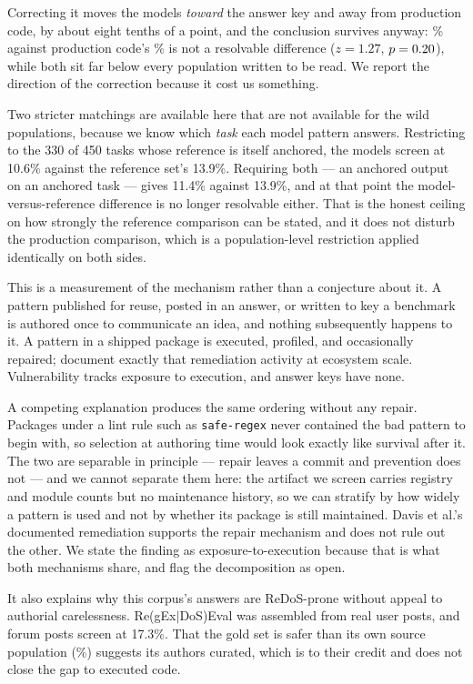 \documentclass[11pt]{article}
\begin{document}
Correcting it moves the models \emph{toward} the answer key and away from
production code, by about eight tenths of a point, and the conclusion survives
anyway: \anchoredmodels{}\% against production code's \anchoredprod{}\% is not
a resolvable difference ($z = 1.27$, $p = 0.20{}$), while both sit far
below every population written to be read. We report the direction of the
correction because it cost us something.

Two stricter matchings are available here that are not available for the wild
populations, because we know which \emph{task} each model pattern answers.
Restricting to the 330 of 450 tasks whose reference is itself anchored, the
models screen at 10.6\% against the reference set's 13.9\%. Requiring both ---
an anchored output on an anchored task --- gives 11.4\% against 13.9\%, and at
that point the model-versus-reference difference is no longer resolvable
either. That is the honest ceiling on how strongly the reference comparison
can be stated, and it does not disturb the production comparison, which is a
population-level restriction applied identically on both sides.

This is a measurement of the mechanism rather than a conjecture about it. A
pattern published for reuse, posted in an answer, or written to key a
benchmark is authored once to communicate an idea, and nothing subsequently
happens to it. A pattern in a shipped package is executed, profiled, and
occasionally repaired; \citet{davis2018redos} document exactly that
remediation activity at ecosystem scale. Vulnerability tracks exposure to
execution, and answer keys have none.

A competing explanation produces the same ordering without any repair.
Packages under a lint rule such as \texttt{safe-regex} never contained the bad
pattern to begin with, so selection at authoring time would look exactly like
survival after it. The two are separable in principle --- repair leaves a
commit and prevention does not --- and we cannot separate them here: the
artifact we screen carries registry and module counts but no maintenance
history, so we can stratify by how widely a pattern is used and not by whether
its package is still maintained. Davis et al.'s documented remediation
supports the repair mechanism and does not rule out the other. We state the
finding as exposure-to-execution because that is what both mechanisms share,
and flag the decomposition as open.

It also explains why this corpus's answers are ReDoS-prone without appeal to
authorial carelessness. Re(gEx$|$DoS)Eval was assembled from real user posts,
and forum posts screen at 17.3\%. That the gold set is safer than its own
source population (\anchoredgold{}\%) suggests its authors curated, which is to their
credit and does not close the gap to executed code.
\end{document}
